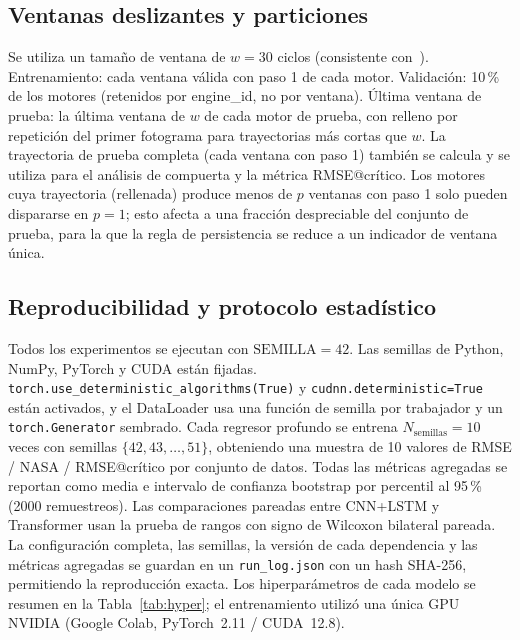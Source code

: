 \documentclass[5p,times,authoryear]{elsarticle}
\begin{document}
\subsection{Ventanas deslizantes y particiones}\label{sec:exp-windows}

Se utiliza un tamaño de ventana de $w{=}30$ ciclos (consistente con~\citep{li2018remaining}). Entrenamiento: cada ventana válida con paso 1 de cada motor. Validación: 10\,\% de los motores (retenidos por engine\_id, no por ventana). Última ventana de prueba: la última ventana de $w$ de cada motor de prueba, con relleno por repetición del primer fotograma para trayectorias más cortas que $w$. La trayectoria de prueba completa (cada ventana con paso 1) también se calcula y se utiliza para el análisis de compuerta y la métrica RMSE@crítico. Los motores cuya trayectoria (rellenada) produce menos de $p$ ventanas con paso 1 solo pueden dispararse en $p{=}1$; esto afecta a una fracción despreciable del conjunto de prueba, para la que la regla de persistencia se reduce a un indicador de ventana única.

\subsection{Reproducibilidad y protocolo estadístico}\label{sec:exp-repro}

\begin{sloppypar}
Todos los experimentos se ejecutan con $\mathrm{SEMILLA}{=}42$. Las semillas de Python, NumPy, PyTorch y CUDA están fijadas. \texttt{torch.use\_deterministic\_algorithms(True)} y \texttt{cudnn.deterministic=True} están activados, y el DataLoader usa una función de semilla por trabajador y un \texttt{torch.Generator} sembrado. Cada regresor profundo se entrena $N_{\mathrm{semillas}}{=}10$ veces con semillas $\{42,43,\ldots,51\}$, obteniendo una muestra de 10 valores de RMSE / NASA / RMSE@crítico por conjunto de datos. Todas las métricas agregadas se reportan como media e intervalo de confianza bootstrap por percentil al 95\,\% (2000 remuestreos). Las comparaciones pareadas entre CNN+LSTM y Transformer usan la prueba de rangos con signo de Wilcoxon bilateral pareada. La configuración completa, las semillas, la versión de cada dependencia y las métricas agregadas se guardan en un \texttt{run\_log.json} con un hash SHA-256, permitiendo la reproducción exacta. Los hiperparámetros de cada modelo se resumen en la Tabla~\ref{tab:hyper}; el entrenamiento utilizó una única GPU NVIDIA (Google Colab, PyTorch~2.11 / CUDA~12.8).
\end{sloppypar}
\end{document}
